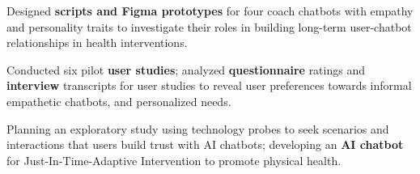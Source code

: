\vspace{-1mm}
      \resumeItemListStart


        \item Designed \textbf{scripts and Figma prototypes} for four coach chatbots with empathy and personality traits to investigate their roles in building long-term user-chatbot relationships in health interventions.
        \item Conducted six pilot \textbf{user studies}; analyzed \textbf{questionnaire} ratings and \textbf{interview} transcripts for user studies to reveal user preferences towards informal empathetic chatbots, and personalized needs.
      \item Planning an exploratory study using technology probes to seek scenarios and interactions that users build trust with AI chatbots; developing an \textbf{AI chatbot} for Just-In-Time-Adaptive Intervention to promote physical health.
      \resumeItemListEnd




